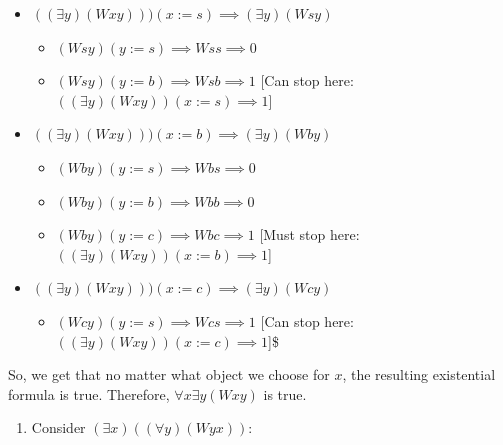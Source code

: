 \documentclass[
]{book}
\providecommand{\tightlist}{%
  \setlength{\itemsep}{0pt}\setlength{\parskip}{0pt}}
\begin{document}
\begin{itemize}
\tightlist
\item
  \(((\exists y)(Wxy)))(x:=s) \implies (\exists y)(Wsy)\)

  \begin{itemize}
  \tightlist
  \item
    \((Wsy)(y:=s) \implies Wss \implies 0\)
  \item
    \((Wsy)(y:=b) \implies Wsb \implies 1\) {[}Can stop here: \(((\exists y)(Wxy))(x:=s) \implies 1\){]}
  \end{itemize}
\item
  \(((\exists y)(Wxy)))(x:=b) \implies (\exists y)(Wby)\)

  \begin{itemize}
  \tightlist
  \item
    \((Wby)(y:=s) \implies Wbs \implies 0\)
  \item
    \((Wby)(y:=b) \implies Wbb \implies 0\)
  \item
    \((Wby)(y:=c) \implies Wbc \implies 1\) {[}Must stop here: \(((\exists y)(Wxy))(x:=b) \implies 1\){]}
  \end{itemize}
\item
  \(((\exists y)(Wxy)))(x:=c) \implies (\exists y)(Wcy)\)

  \begin{itemize}
  \tightlist
  \item
    \((Wcy)(y:=s) \implies Wcs \implies 1\) {[}Can stop here: \(((\exists y)(Wxy))(x:= c) \implies 1\){]}\$
  \end{itemize}
\end{itemize}

So, we get that no matter what object we choose for \(x\), the resulting existential formula is true. Therefore, \(\forall x\exists y (Wxy)\) is true.

\begin{enumerate}
\def\labelenumi{\arabic{enumi}.}
\setcounter{enumi}{1}
\tightlist
\item
  Consider \((\exists x)((\forall y)(Wyx))\):
\end{enumerate}
\end{document}
